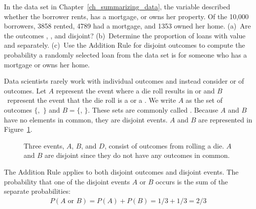
\begin{exercisewrap}
\begin{nexercise}
In the  data set in Chapter~\ref{ch_summarizing_data},
the  variable described whether the borrower
rents, has a mortgage, or owns her property.
Of the 10,000 borrowers, 3858 rented, 4789 had a mortgage,
and 1353 owned her home.
(a)~Are the outcomes , ,
and  disjoint?
(b)~Determine the proportion of loans with value 
and  separately.
(c)~Use the Addition Rule for disjoint outcomes to compute
the probability a randomly selected loan from the data set
is for someone who has a mortgage or owns her
home.\footnotemark
\end{nexercise}
\end{exercisewrap}


Data scientists rarely work with individual outcomes and instead consider  or  of outcomes. Let $A$ represent the event where a die roll results in  or  and $B$~represent the event that the die roll is a  or a . We write $A$ as the set of outcomes $\{$,~$\}$ and $B=\{$, $\}$. These sets are commonly called . Because $A$ and $B$ have no elements in common, they are disjoint events. $A$ and $B$ are represented in Figure~\ref{disjointSets}.

\begin{figure}[hhh]
  \centering
  \caption{Three events, $A$, $B$, and $D$, consist of
      outcomes from rolling a die.
      $A$ and $B$ are disjoint since they do not have
      any outcomes in common.}
  \label{disjointSets}
\end{figure}

The Addition Rule applies to both disjoint outcomes and disjoint events. The probability that one of the disjoint events $A$ or $B$ occurs is the sum of the separate probabilities:
\begin{align*}
P(A\text{ or }B) = P(A) + P(B) = 1/3 + 1/3 = 2/3
\end{align*}

